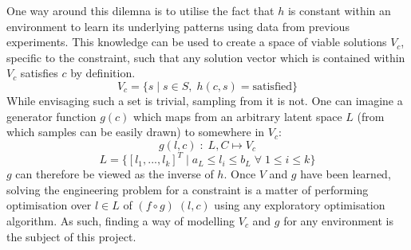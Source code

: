 \documentclass[../../main.tex]{subfiles}
\begin{document}
One way around this dilemna is to utilise the fact that $h$ is constant within an environment to learn its underlying patterns using data from previous experiments.
This knowledge can be used to create a space of viable solutions $V_c$, specific to the constraint, such that any solution vector which is contained within $V_c$ satisfies $c$ by definition.
\begin{equation}
    V_c=\{s\;|\;s\in S,\;h(c,s)=\text{satisfied}\}
\end{equation}
While envisaging such a set is trivial, sampling from it is not.
One can imagine a generator function $g(c)$ which maps from an arbitrary latent space $L$ (from which samples can be easily drawn) to somewhere in $V_c$:
\begin{equation}
    g(l,c)\;:\;L,C\mapsto V_c
\end{equation}
\begin{equation}
    L=\{[l_1,...,l_k]^T\;|\;a_L\le l_i\le b_L\;\forall\;1\le i\le k\}
\end{equation}
$g$ can therefore be viewed as the inverse of $h$.
Once $V$ and $g$ have been learned, solving the engineering problem for a constraint is a matter of performing optimisation over $l\in L$ of $(f\circ g)\;(l,c)$ using any exploratory optimisation algorithm.
As such, finding a way of modelling $V_c$ and $g$ for any environment is the subject of this project.
\end{document}
